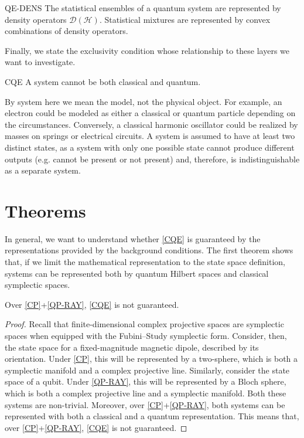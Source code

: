 \documentclass{techbrief}
\begin{document}
\begin{condition}{QE-DENS}
	The statistical ensembles of a quantum system are represented by density operators $\mathcal{D}(\mathcal{H})$. Statistical mixtures are represented by convex combinations of density operators.
\end{condition}

Finally, we state the exclusivity condition whose relationship to these layers we want to investigate.

\begin{condition}{CQE}
	A system cannot be both classical and quantum.
\end{condition}

By system here we mean the model, not the physical object. For example, an electron could be modeled as either a classical or quantum particle depending on the circumstances. Conversely, a classical harmonic oscillator could be realized by masses on springs or electrical circuits. A system is assumed to have at least two distinct states, as a system with only one possible state cannot produce different outputs (e.g. cannot be present or not present) and, therefore, is indistinguishable as a separate system. 

\section{Theorems}

In general, we want to understand whether \ref{CQE} is guaranteed by the representations provided by the background conditions. The first theorem shows that, if we limit the mathematical representation to the state space definition, systems can be represented both by quantum Hilbert spaces and classical symplectic spaces.

\begin{thrm}
	Over \ref{CP}+\ref{QP-RAY}, \ref{CQE} is not guaranteed.
\end{thrm}

\begin{proof}
	Recall that finite-dimensional complex projective spaces are symplectic spaces when equipped with the Fubini–Study symplectic form. Consider, then, the state space for a fixed-magnitude magnetic dipole, described by its orientation. Under \ref{CP}, this will be represented by a two-sphere, which is both a symplectic manifold and a complex projective line. Similarly, consider the state space of a qubit. Under \ref{QP-RAY}, this will be represented by a Bloch sphere, which is both a complex projective line and a symplectic manifold. Both these systems are non-trivial. Moreover, over \ref{CP}+\ref{QP-RAY}, both systems can be represented with both a classical and a quantum representation. This means that, over \ref{CP}+\ref{QP-RAY}, \ref{CQE} is not guaranteed.
\end{proof}
\end{document}

